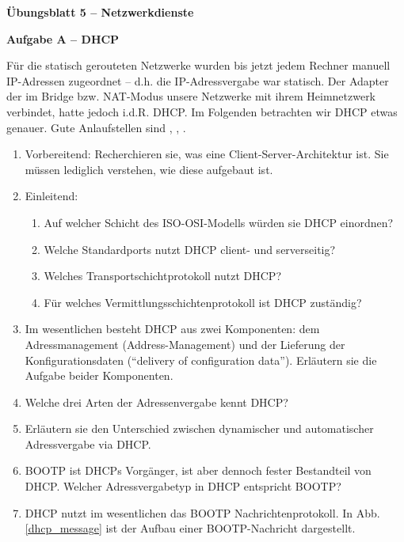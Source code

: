 \documentclass[paper=a4,fontsize=11pt]{scrartcl}%
\numberwithin{equation}{section}
\begin{document}
\begin{center}
\Large{\textbf{Übungsblatt 5 -- Netzwerkdienste}}
\end{center}

\begin{center} \Large{\textbf{Aufgabe A -- DHCP}} \end{center} \vskip0.25in
Für die statisch gerouteten Netzwerke wurden bis jetzt jedem Rechner manuell IP-Adressen zugeordnet -- d.h. die IP-Adressvergabe war statisch. Der Adapter der im Bridge bzw. NAT-Modus unsere Netzwerke mit ihrem Heimnetzwerk verbindet, hatte jedoch i.d.R. DHCP. Im Folgenden betrachten wir DHCP etwas genauer. Gute Anlaufstellen sind \cite[Kap. 4.4, S. 345ff]{Kurose2012}, \cite[Kap. 6, S. 233ff]{fall2011tcp}, \cite[Kap. 60, S. 977ff]{kozierok2005tcp}.
\begin{enumerate}
	\item Vorbereitend: Recherchieren sie, was eine Client-Server-Architektur ist. Sie müssen lediglich verstehen, wie diese aufgebaut ist.
	\item Einleitend:
	\begin{enumerate}
		\item Auf welcher Schicht des ISO-OSI-Modells würden sie DHCP einordnen?
		\item Welche Standardports nutzt DHCP client- und serverseitig?
		\item Welches Transportschichtprotokoll nutzt DHCP?
		\item Für welches Vermittlungsschichtenprotokoll ist DHCP zuständig?
	\end{enumerate}
	\item Im wesentlichen besteht DHCP aus zwei Komponenten: dem Adressmanagement (Address-Management) und der Lieferung der Konfigurationsdaten (\enquote{delivery of configuration data}). Erläutern sie die Aufgabe beider Komponenten.
	\item Welche drei Arten der Adressenvergabe kennt DHCP?
	\item Erläutern sie den Unterschied zwischen dynamischer und automatischer Adressvergabe via DHCP.
	\item BOOTP ist DHCPs Vorgänger, ist aber dennoch fester Bestandteil von DHCP. Welcher Adressvergabetyp in DHCP entspricht BOOTP?
	\item DHCP nutzt im wesentlichen das BOOTP Nachrichtenprotokoll. In Abb. \ref{dhcp_message} ist der Aufbau einer BOOTP-Nachricht dargestellt.
	\begin{figure}[H]
	\centering

\end{figure}
\end{enumerate}
\end{document}
